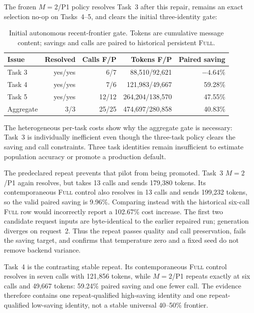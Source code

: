 \documentclass[11pt]{article}
\begin{document}
The frozen $M=2$/P1 policy resolves Task~3 after this repair, remains an exact
selection no-op on Tasks~4--5, and clears the initial three-identity gate:

\begin{table}[H]
\centering
\small
\caption{Initial autonomous recent-frontier gate.  Tokens are cumulative
message content; savings and calls are paired to historical persistent
\textsc{Full}.}
\label{tab:main-frontier-p1-gate}
\begin{tabular}{lrrrr}
\toprule
Issue & Resolved & Calls F/P & Tokens F/P & Paired saving \\
\midrule
Task 3 & yes/yes & 6/7 & 88,510/92,621 & $-4.64\%$ \\
Task 4 & yes/yes & 7/6 & 121,983/49,667 & 59.28\% \\
Task 5 & yes/yes & 12/12 & 264,204/138,570 & 47.55\% \\
\midrule
Aggregate & 3/3 & 25/25 & 474,697/280,858 & 40.83\% \\
\bottomrule
\end{tabular}
\end{table}

The heterogeneous per-task costs show why the aggregate gate is necessary:
Task~3 is individually inefficient even though the three-task policy clears
the saving and call constraints.  Three task identities remain insufficient
to estimate population accuracy or promote a production default.

The predeclared repeat prevents that pilot from being promoted.  Task~3
$M=2$/P1 again resolves, but takes 13 calls and sends 179,380 tokens.  Its
contemporaneous \textsc{Full} control also resolves in 13 calls and sends
199,232 tokens, so the valid paired saving is 9.96\%.  Comparing instead with
the historical six-call \textsc{Full} row would incorrectly report a 102.67\%
cost increase.  The first two candidate request inputs are byte-identical to
the earlier repaired run; generation diverges on request~2.  Thus the repeat
passes quality and call preservation, fails the saving target, and confirms
that temperature zero and a fixed seed do not remove backend variance.

Task~4 is the contrasting stable repeat.  Its contemporaneous \textsc{Full}
control resolves in seven calls with 121,856 tokens, while $M=2$/P1 repeats
exactly at six calls and 49,667 tokens: 59.24\% paired saving and one fewer
call.  The evidence therefore contains one repeat-qualified high-saving
identity and one repeat-qualified low-saving identity, not a stable universal
40--50\% frontier.
\end{document}

